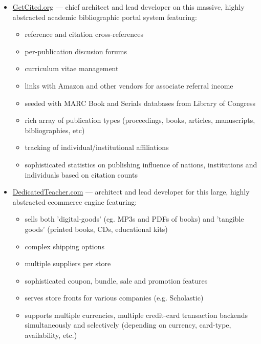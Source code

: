 \documentclass[line,margin]{res}
\begin{document}
\begin{resume}
\begin{position}
\begin{itemize}
\item \href{https://web.archive.org/web/20140517102110/http://getcited.org/}{GetCited.org} 
  --- chief architect and lead developer on this massive, highly abstracted 
      academic bibliographic portal system featuring:
  \begin{itemize}
    \item reference and citation cross-references
    \item per-publication discusion forums
    \item curriculum vitae management
    \item links with Amazon and other vendors for associate
    referral income
    \item seeded with MARC Book and Serials databases from Library of Congress
    \item rich array of publication types (proceedings, books, articles,
       manuscripts, bibliographies, etc)
    \item tracking of individual/institutional affiliations
    \item sophisticated statistics on publishing influence of
       nations, institutions and individuals based on citation counts
  \end{itemize}    

\item \href{http://www.dedicatedteacher.com/}{DedicatedTeacher.com}
   --- architect and lead developer
  for this large, highly abstracted ecommerce engine featuring:
    \begin{itemize}
      \item sells both 'digital-goods' (eg. MP3s and PDFs of books)
      and 'tangible goods' (printed books, CDs, educational kits)
      \item complex shipping options
      \item multiple suppliers per store
      \item sophisticated coupon, bundle, sale and promotion features
      \item serves store fronts for various companies 
      (e.g. Scholastic)
      \item supports multiple currencies, multiple credit-card
      transaction backends simultaneously and selectively 
      (depending on currency, card-type, availability, etc.)
    \end{itemize}


\end{itemize}
\end{position}
\end{resume}
\end{document}
